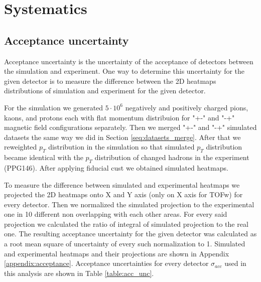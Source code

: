 \section{Systematics}

\subsection{Acceptance uncertainty}

Acceptance uncertainty is the uncertainty of the acceptance of detectors between the simulation and experiment. One way to determine this uncertainty for the given detector is to measure the difference between the 2D heatmaps distributions of simulation and experiment for the given detector. 

For the simulation we generated $5\cdot10^6$ negatively and positively charged pions, kaons, and protons each with flat momentum distribuion for "+-" and "-+" magnetic field configurations separately. Then we merged "+-" and "-+" simulated datasets the same way we did in Section \ref{seq:datasets_merge}. After that we reweighted $p_T$ distribution in the simulation so that simulated $p_T$ distribution became identical with the $p_T$ distribution of changed hadrons in the experiment (PPG146). After applying fiducial cust we obtained simulated heatmaps.

To measure the difference between simulated and experimental heatmaps we projected the 2D heatmaps onto X and Y axis (only on X axis for TOFw) for every detector. Then we normalized the simulated projection to the experimental one in 10 different non overlapping with each other areas. For every said projection we calculated the ratio of integral of simulated projection to the real one. The resulting acceptance uncertainty for the given detector was calculated as a root mean square of uncertainty of every such normalization to 1. Simulated and experimental heatmaps and their projections are shown in Appendix \ref{appendix:acceptance}. Acceptance uncertainties for every detector $\sigma_{acc}$ used in this analysis are shown in Table \ref{table:acc_unc}.

